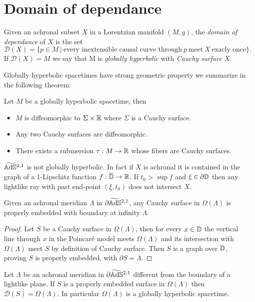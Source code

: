 \section{Domain of dependance}
\begin{definition}
    Given an achronal subset $X$ in a Lorentzian manifold $(M,g)$, the \textit{domain of dependance} of $X$ is the set
    \[
        \mathcal{D}(X)= \{ p \in M \ | \ \text{every inextensible causal curve through} \ p \ \text{meet} \ X \ \text{exacly once} \}.
    \]
    If $\mathcal{D}(X)=M$ we say that M is  \textit{globally hyperbolic} with \textit{Cauchy surface} $X$.
\end{definition}
Globally hyperbolic spacetimes have strong geometric property we summarize in the following theorem:
\begin{theorem} \label{GH_structure}
    Let $M$ be a globally hyperbolic spacetime, then
    \begin{itemize}
        \item $M$ is diffeomorphic to $\Sigma \times \mathbb{R}$ where $\Sigma$ is a Cauchy surface.
        \item Any two Cauchy surfaces are diffeomorphic.
        \item There exists a submersion $\tau : M \to \mathbb{R}$ whose fibers are Cauchy surfaces.
    \end{itemize}
\end{theorem}
\begin{observation}
    $\widetilde{\mathbb{A}\mathrm{d}\mathbb{S}}{}^{2,1}$ is not globally hyperbolic. In fact if $X$ is achronal it is contained in the graph of a 1-Lipschitz function $f: \overline{\mathbb{D}} \to \mathbb{R}$. If $t_0 > \sup f$ and $\xi \in \partial\mathbb{D}$ then any lightlike ray with past end-point $(\xi,t_0)$ does not intersect $X$.
\end{observation}
\begin{lemma}
    Given an achronal meridian $\Lambda$ in $\partial\widetilde{\mathbb{A}\mathrm{d}\mathbb{S}}{}^{2,1}$, any Cauchy surface in $\Omega(\Lambda)$ is properly embedded with boundary at infinity $\Lambda$.
\end{lemma}
\begin{proof}
    Let $S$ be a Cauchy surface in $\Omega(\Lambda)$, then for every $x\in \mathbb{D}$ the vertical line through $x$ in the Poincaré model meets $\Omega(\Lambda)$ and its intersection with $\Omega(\Lambda)$ meet $S$ by definition of Cauchy surface. Then $S$ is a graph over $\mathbb{D}$, proving $S$ is properly embedded, with $\partial S = \Lambda$.
\end{proof}
\begin{proposition}
    Let $\Lambda$ be an achronal meridian in $\partial\widetilde{\mathbb{A}\mathrm{d}\mathbb{S}}{}^{2,1}$ different from the boundary of a lightlike plane. If $S$ is a properly embedded surface in $\Omega(\Lambda)$ then $\mathcal{D}(S) = \Omega(\Lambda)$. In particular $\Omega(\Lambda)$ is a globally hyperbolic spacetime. 
\end{proposition}
